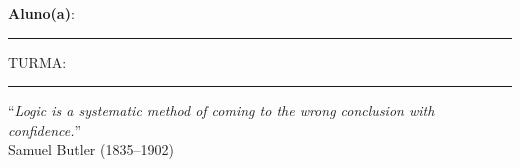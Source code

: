 \documentclass[11pt, a4paper,final]{article}
\begin{document}
\begin{large}
\begin{center}

\end{center}
\end{large} 

\textbf{Aluno(a)}: \noindent\rule{0.7\textwidth}{1pt} TURMA: \noindent\rule{0.05\textwidth}{1pt} 

\begin{flushright}
``{\em  Logic is a systematic method of coming to the wrong conclusion with confidence.}''\\
Samuel Butler (1835--1902)
\end{flushright}

\end{document}
